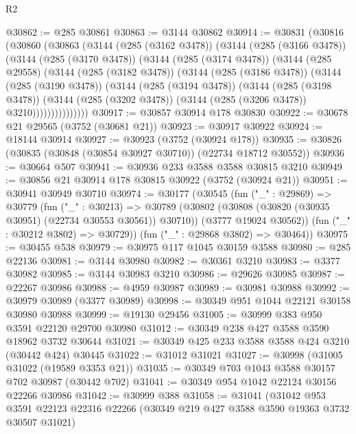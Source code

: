 \begin{lexlean}{R2}
\begin{coremodule}
@30862 := @285 @30861
@30863 := @3144 @30862
@30914 := @30831
    (@30816
      (@30860
        (@30863
          (@3144
            (@285 (@3162 @3478))
            (@3144
              (@285 (@3166 @3478))
              (@3144
                (@285 (@3170 @3478))
                (@3144
                  (@285 (@3174 @3478))
                  (@3144
                    (@285 @29558)
                    (@3144
                      (@285 (@3182 @3478))
                      (@3144
                        (@285 (@3186 @3478))
                        (@3144
                          (@285 (@3190 @3478))
                          (@3144
                            (@285 (@3194 @3478))
                            (@3144
                              (@285 (@3198 @3478))
                              (@3144
                                (@285 (@3202 @3478))
                                (@3144 (@285 (@3206 @3478)) @3210)))))))))))))))
@30917 := @30857 @30914 @178 @30830
@30922 := @30678 @21 @29565 (@3752 (@30681 @21))
@30923 := @30917 @30922
@30924 := @18144 @30914
@30927 := @30923 (@3752 (@30924 @178))
@30935 := @30826 (@30835 (@30848 (@30854 @30927 @30710)) (@22734 @18712 @30552))
@30936 := @30664 @507
@30941 := @30936 @233 @3588 @3588 @30815 @3210
@30949 := @30856 @21 @30914 @178 @30815 @30922 (@3752 (@30924 @21))
@30951 := @30941 @30949 @30710
@30974 := @30177
    (@30545
      (fun ("_" : @29869) =>
      @30779
        (fun ("_" : @30213) =>
        @30789
          (@30802 (@30808 (@30820 (@30935 @30951) (@22734 @30553 @30561)) @30710))
          (@3777 @19024 @30562))
        (fun ("_" : @30212 @3802) => @30729))
      (fun ("_" : @29868 @3802) => @30464))
@30975 := @30455 @538
@30979 := @30975 @117 @1045 @30159 @3588
@30980 := @285 @22136
@30981 := @3144 @30980
@30982 := @30361 @3210
@30983 := @3377 @30982
@30985 := @3144 @30983 @3210
@30986 := @29626 @30985
@30987 := @22267 @30986
@30988 := @4959 @30987
@30989 := @30981 @30988
@30992 := @30979 @30989 (@3377 @30989)
@30998 := @30349 @951 @1044 @22121 @30158 @30980 @30988
@30999 := @19130 @29456
@31005 := @30999 @383 @950 @3591 @22120 @29700 @30980
@31012 := @30349 @238 @427 @3588 @3590 @18962 @3732 @30644
@31021 := @30349 @425 @233 @3588 @3588 @424 @3210 (@30442 @424) @30445
@31022 := @31012 @31021
@31027 := @30998 (@31005 @31022 (@19589 @3353 @21))
@31035 := @30349 @703 @1043 @3588 @30157 @702 @30987 (@30442 @702)
@31041 := @30349 @954 @1042 @22124 @30156 @22266 @30986
@31042 := @30999 @388
@31058 := @31041
    (@31042
      @953
      @3591
      @22123
      @22316
      @22266
      (@30349 @219 @427 @3588 @3590 @19363 @3732 @30507 @31021)

\end{coremodule}
\end{lexlean}
